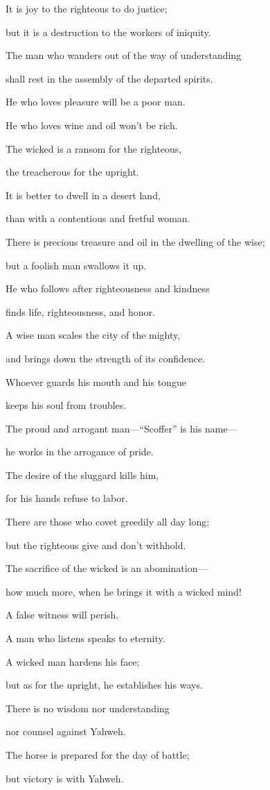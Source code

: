 {\par }{\Q {}It is joy to the righteous to do justice;
\par }{\QB but it is a destruction to the workers of iniquity.
\par }{\Q {}The man who wanders out of the way of understanding
\par }{\QB shall rest in the assembly of the departed spirits.
\par }{\Q {}He who loves pleasure will be a poor man.
\par }{\QB He who loves wine and oil won’t be rich.
\par }{\Q {}The wicked is a ransom for the righteous,
\par }{\QB the treacherous for the upright.
\par }{\Q {}It is better to dwell in a desert land,
\par }{\QB than with a contentious and fretful woman.
\par }{\Q {}There is precious treasure and oil in the dwelling of the wise;
\par }{\QB but a foolish man swallows it up.
\par }{\Q {}He who follows after righteousness and kindness
\par }{\QB finds life, righteousness, and honor.
\par }{\Q {}A wise man scales the city of the mighty,
\par }{\QB and brings down the strength of its confidence.
\par }{\Q {}Whoever guards his mouth and his tongue
\par }{\QB keeps his soul from troubles.
\par }{\Q {}The proud and arrogant man—“Scoffer” is his name—
\par }{\QB he works in the arrogance of pride.
\par }{\Q {}The desire of the sluggard kills him,
\par }{\QB for his hands refuse to labor.
\par }{\Q {}There are those who covet greedily all day long;
\par }{\QB but the righteous give and don’t withhold.
\par }{\Q {}The sacrifice of the wicked is an abomination—
\par }{\QB how much more, when he brings it with a wicked mind!
\par }{\Q {}A false witness will perish.
\par }{\QB A man who listens speaks to eternity.
\par }{\Q {}A wicked man hardens his face;
\par }{\QB but as for the upright, he establishes his ways.
\par }{\Q {}There is no wisdom nor understanding
\par }{\QB nor counsel against Yahweh.
\par }{\Q {}The horse is prepared for the day of battle;
\par }{\QB but victory is with Yahweh.
\par }{\BB \par }
